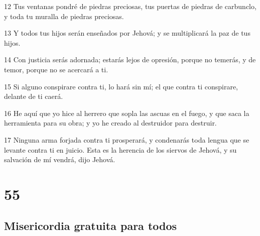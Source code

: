 \par 12 Tus ventanas pondré de piedras preciosas, tus puertas de piedras de carbunclo, y toda tu muralla de piedras preciosas. 
\par 13 Y todos tus hijos serán enseñados por Jehová; y se multiplicará la paz de tus hijos.
\par 14 Con justicia serás adornada; estarás lejos de opresión, porque no temerás, y de temor, porque no se acercará a ti.
\par 15 Si alguno conspirare contra ti, lo hará sin mí; el que contra ti conspirare, delante de ti caerá.
\par 16 He aquí que yo hice al herrero que sopla las ascuas en el fuego, y que saca la herramienta para su obra; y yo he creado al destruidor para destruir.
\par 17 Ninguna arma forjada contra ti prosperará, y condenarás toda lengua que se levante contra ti en juicio. Esta es la herencia de los siervos de Jehová, y su salvación de mí vendrá, dijo Jehová.

\chapter{55}

\section*{Misericordia gratuita para todos}

